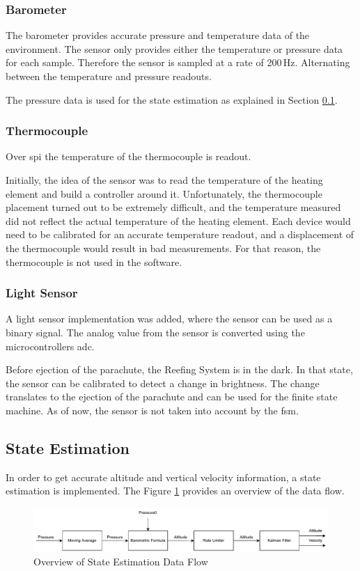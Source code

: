 \subsubsection{Barometer}
The barometer provides accurate pressure and temperature data of the environment. The sensor only provides either the temperature or pressure data for each sample. Therefore the sensor is sampled at a rate of 200\,Hz. Alternating between the temperature and pressure readouts. 

The pressure data is used for the state estimation as explained in Section \ref{state-estimation}.

\newpage

\subsubsection{Thermocouple}
Over \acrshort{spi} the temperature of the thermocouple is readout. 

Initially, the idea of the sensor was to read the temperature of the heating element and build a controller around it. Unfortunately, the thermocouple placement turned out to be extremely difficult, and the temperature measured did not reflect the actual temperature of the heating element. Each device would need to be calibrated for an accurate temperature readout, and a displacement of the thermocouple would result in bad measurements. For that reason, the thermocouple is not used in the software.  

\subsubsection{Light Sensor}
A light sensor implementation was added, where the sensor can be used as a binary signal. The analog value from the sensor is converted using the microcontrollers \acrshort{adc}. 

Before ejection of the parachute, the Reefing System is in the dark. In that state, the sensor can be calibrated to detect a change in brightness. The change translates to the ejection of the parachute and can be used for the finite state machine. As of now, the sensor is not taken into account by the \acrshort{fsm}.

\subsection{State Estimation}\label{state-estimation}
In order to get accurate altitude and vertical velocity information, a state estimation is implemented. The Figure \ref{fig:state-est} provides an overview of the data flow.
\begin{figure}[h!]
	\includegraphics[width=\textwidth]{images/state-est}
	\caption{Overview of State Estimation Data Flow}
	\label{fig:state-est}
\end{figure}

